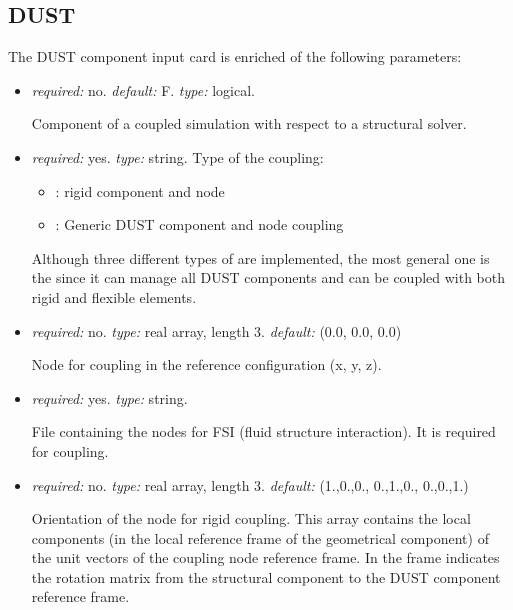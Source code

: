 \subsection{DUST}
\label{subsec:DUSTpreCICE}
The DUST component input card is enriched of the following parameters:
\begin{itemize}
    \item {} \textit{required:} no. \textit{default:} F. \textit{type:} logical.
    
    Component of a coupled simulation with respect to a structural solver.
    
    \item {} \textit{required:} yes. \textit{type:} string. 
    Type of the coupling:
    \begin{itemize}
        \item {}: rigid component and node 
        \item {}: Generic DUST component and node coupling
    \end{itemize}
    Although three different types of are implemented, the most general one is the  since it can manage all DUST components and can be coupled with both rigid and flexible elements.  
   
   \item {} \textit{required:} no. \textit{type:} real array, length 3. \textit{default:} (0.0, 0.0, 0.0)
   
   Node for  coupling in the reference configuration (x, y, z).
   
   \item {} \textit{required:} yes. \textit{type:} string. 
   
   File containing the nodes for FSI (fluid structure interaction). It is required for  coupling. 
   
   \item {} \textit{required:} no. \textit{type:} real array, length 3. \textit{default:} (1.,0.,0., 0.,1.,0., 0.,0.,1.)
   
   Orientation of the node for rigid coupling. This array contains the local components (in the local reference frame of the geometrical           component) of the unit vectors of the coupling node reference frame. In the  frame indicates the rotation matrix from the structural component to the DUST component reference frame. 
   
\end{itemize}
